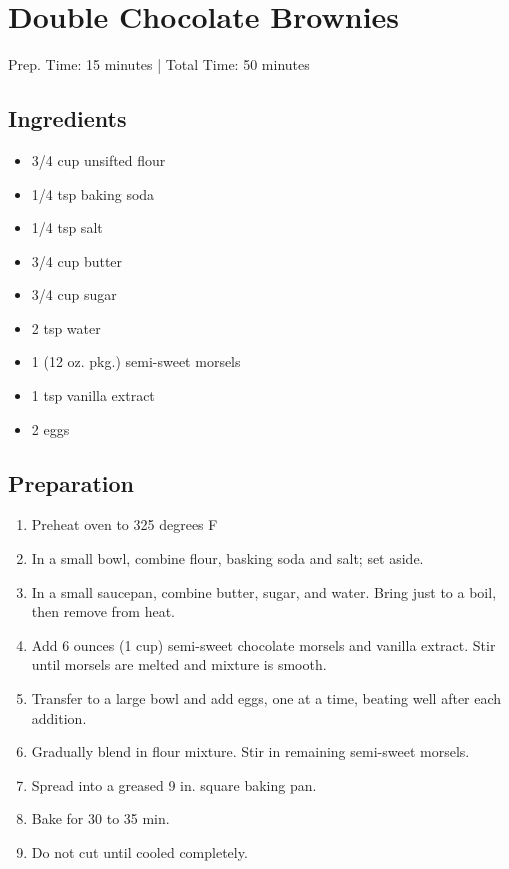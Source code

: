 \section{Double Chocolate Brownies}

\begin{center}
Prep. Time: 15 minutes |
Total Time: 50 minutes
\end{center}

\subsection{Ingredients}
\begin{multicols}{2}
\begin{itemize}
    \item 3/4 cup unsifted flour
    \item 1/4 tsp baking soda
    \item 1/4 tsp salt
    \item 3/4 cup butter
    \item 3/4 cup sugar
    \item 2 tsp water
    \item 1 (12 oz. pkg.) semi-sweet morsels
    \item 1 tsp vanilla extract
    \item 2 eggs
\end{itemize}
\end{multicols}

\subsection{Preparation}
\begin{enumerate}
    \item Preheat oven to 325 degrees F
    \item In a small bowl, combine flour, basking soda and salt; set aside.
    \item In a small saucepan, combine butter, sugar, and water. Bring just to a boil, then remove from heat.
    \item Add 6 ounces (1 cup) semi-sweet chocolate morsels and vanilla extract. Stir until morsels are melted and mixture is smooth.
    \item Transfer to a large bowl and add eggs, one at a time, beating well after each addition.
    \item Gradually blend in flour mixture. Stir in remaining semi-sweet morsels.
    \item Spread into a greased 9 in. square baking pan.
    \item Bake for 30  to 35 min.
    \item Do not cut until cooled completely.
\end{enumerate}


